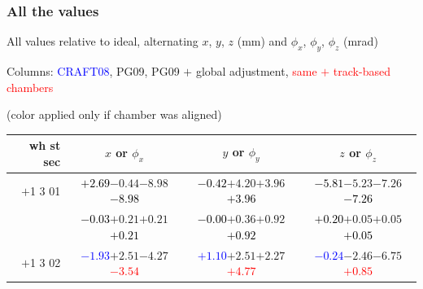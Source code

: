 \documentclass[compress]{beamer}
\begin{document}
\begin{frame}
\frametitle{All the values}
\tiny

All values relative to ideal, alternating $x$, $y$, $z$ (mm) and $\phi_x$, $\phi_y$, $\phi_z$ (mrad)

Columns: \textcolor{blue}{CRAFT08}, PG09, PG09 $+$ global adjustment, \textcolor{red}{same $+$ track-based chambers}

\hfill (color applied only if chamber was aligned)

\vfill
\renewcommand{\arraystretch}{1.1}
\begin{tabular}{r | c | c | c}
wh st sec & $x$ or $\phi_x$ & $y$ or $\phi_y$ & $z$ or $\phi_z$ \\\hline
$+$1 3 01 & \textcolor{black}{$+2.69$}\hspace{0.1 cm}$-0.44$\hspace{0.1 cm}$-8.98$\hspace{0.1 cm}\textcolor{black}{$-8.98$} & \textcolor{black}{$-0.42$}\hspace{0.1 cm}$+4.20$\hspace{0.1 cm}$+3.96$\hspace{0.1 cm}\textcolor{black}{$+3.96$} & \textcolor{black}{$-5.81$}\hspace{0.1 cm}$-5.23$\hspace{0.1 cm}$-7.26$\hspace{0.1 cm}\textcolor{black}{$-7.26$} \\
          & \textcolor{black}{$-0.03$}\hspace{0.1 cm}$+0.21$\hspace{0.1 cm}$+0.21$\hspace{0.1 cm}\textcolor{black}{$+0.21$} & \textcolor{black}{$-0.00$}\hspace{0.1 cm}$+0.36$\hspace{0.1 cm}$+0.92$\hspace{0.1 cm}\textcolor{black}{$+0.92$} & \textcolor{black}{$+0.20$}\hspace{0.1 cm}$+0.05$\hspace{0.1 cm}$+0.05$\hspace{0.1 cm}\textcolor{black}{$+0.05$} \\
$+$1 3 02 & \textcolor{blue}{$-1.93$}\hspace{0.1 cm}$+2.51$\hspace{0.1 cm}$-4.27$\hspace{0.1 cm}\textcolor{red}{$-3.54$} & \textcolor{blue}{$+1.10$}\hspace{0.1 cm}$+2.51$\hspace{0.1 cm}$+2.27$\hspace{0.1 cm}\textcolor{red}{$+4.77$} & \textcolor{blue}{$-0.24$}\hspace{0.1 cm}$-2.46$\hspace{0.1 cm}$-6.75$\hspace{0.1 cm}\textcolor{red}{$+0.85$} \\

\end{tabular}
\end{frame}
\end{document}
